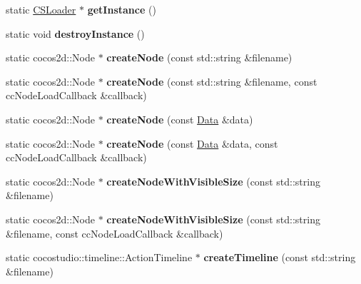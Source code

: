 \begin{DoxyCompactItemize}
\item 
\mbox{\label{classCSLoader_a92500261fa25ab57c190dee0b3a0fd00}} 
static \hyperlink{classCSLoader}{C\+S\+Loader} $\ast$ {\bfseries get\+Instance} ()
\item 
\mbox{\label{classCSLoader_a307270fbd5ec9f57a6c43e3541ca0cac}} 
static void {\bfseries destroy\+Instance} ()
\item 
\mbox{\label{classCSLoader_a11adbcf649582a7aa6c747fb1a15acf7}} 
static cocos2d\+::\+Node $\ast$ {\bfseries create\+Node} (const std\+::string \&filename)
\item 
\mbox{\label{classCSLoader_a19f9ccf29c277e96a12b2cb0adca08a6}} 
static cocos2d\+::\+Node $\ast$ {\bfseries create\+Node} (const std\+::string \&filename, const cc\+Node\+Load\+Callback \&callback)
\item 
\mbox{\label{classCSLoader_a6a6599f15d2fb90511abb185a16273f7}} 
static cocos2d\+::\+Node $\ast$ {\bfseries create\+Node} (const \hyperlink{classData}{Data} \&data)
\item 
\mbox{\label{classCSLoader_a514507f4a0f6d9ce29c64bb50b2dc8bb}} 
static cocos2d\+::\+Node $\ast$ {\bfseries create\+Node} (const \hyperlink{classData}{Data} \&data, const cc\+Node\+Load\+Callback \&callback)
\item 
\mbox{\label{classCSLoader_aec5b001fd1b598146ae62717c1350991}} 
static cocos2d\+::\+Node $\ast$ {\bfseries create\+Node\+With\+Visible\+Size} (const std\+::string \&filename)
\item 
\mbox{\label{classCSLoader_ad37d52b3b95d90b62105403ef592873c}} 
static cocos2d\+::\+Node $\ast$ {\bfseries create\+Node\+With\+Visible\+Size} (const std\+::string \&filename, const cc\+Node\+Load\+Callback \&callback)
\item 
\mbox{\label{classCSLoader_a3a1ac7db5497129ce8a6d99cb62d62de}} 
static cocostudio\+::timeline\+::\+Action\+Timeline $\ast$ {\bfseries create\+Timeline} (const std\+::string \&filename)
\item 

\end{DoxyCompactItemize}
